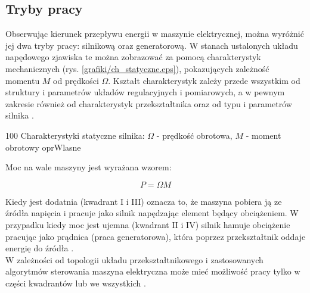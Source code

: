 \subsection{Tryby pracy}

Obserwując kierunek przepływu energii w maszynie elektrycznej, można wyróżnić jej dwa tryby pracy: silnikową oraz generatorową. W stanach ustalonych układu napędowego zjawiska te można zobrazować za pomocą charakterystyk mechanicznych (rys. \ref{grafiki/ch_statyczne.eps}), pokazujących zależność momentu $ M $ od prędkości $ \Omega $. Kształt charakterystyk zależy przede wszystkim od struktury i parametrów układów regulacyjnych i pomiarowych, a w pewnym zakresie również od charakterystyk przekształtnika oraz od typu i parametrów silnika \cite{zawirski}.

	{100}
	{Charakterystyki statyczne silnika: $ \Omega $ - prędkość obrotowa, $ M $ - moment obrotowy}
	{oprWlasne}
	
Moc na wale maszyny jest wyrażana wzorem:

\begin{equation} \label{eq:chs1}
	P = \Omega M
\end{equation}

Kiedy jest dodatnia (kwadrant I i III) oznacza to, że maszyna pobiera ją ze źródła napięcia i pracuje jako silnik napędzając element będący obciążeniem. W przypadku kiedy moc jest ujemna (kwadrant II i IV) silnik hamuje obciążenie pracując jako prądnica (praca generatorowa), która poprzez przekształtnik oddaje energię do źródła \cite{ecn_luty_2012}. \\

W zależności od topologii układu przekształtnikowego i zastosowanych algorytmów sterowania maszyna elektryczna może mieć możliwość pracy tylko w części kwadrantów lub we wszystkich . 








